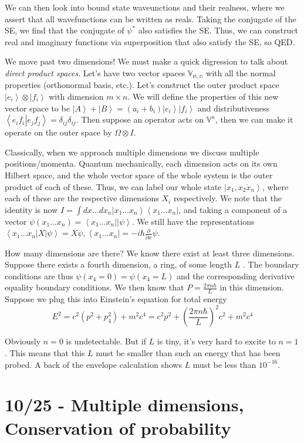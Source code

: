 \documentclass[10pt]{report}
\newcommand{\bra}[1]{\left<#1\right|}
\newcommand{\ket}[1]{\left|#1\right>}
\newcommand{\dotp}[2]{\left<#1\left.\right|#2\right>}
\newcommand{\pd}[2]{\frac{\partial #1}{\partial#2}}
\begin{document}
We can then look into bound state waveunctions and their realness, where we assert that all wavefunctions can be written as reals. Taking the conjugate of the SE, we find that the conjugate of $\psi^*$ also satisfies the SE. Thus, we can construct real and imaginary functions via superposition that also satisfy the SE, so QED.

We move past two dimensions! We must make a quick digression to talk about \emph{direct product spaces}. Let's have two vector spaces $\mathbb{V_{m,n}}$ with all the normal properties (orthonormal basis, etc.). Let's construct the outer product space $\ket{e_i}\otimes \ket{f_i}$ with dimension $m\times n$. We will define the properties of this new vector space to be $\ket{A} + \ket{B} = \left( a_i + b_i \right)\ket{e_i}\ket{f_i}$ and distributiveness $\dotp{e_if_i}{e_jf_j} = \delta_{ij} \delta_{ij}$. Then suppose an operator acts on $\mathbb{V}^n$, then we can make it operate on the outer space by $\Omega \otimes I$. 

Classically, when we approach multiple dimensions we discuss multiple positions/momenta. Quantum mechanically, each dimension acts on its own Hilbert space, and the whole vector space of the whole system is the outer product of each of these. Thus, we can label our whole state $\ket{x_1,x_2\dot x_n}$, where each of these are the respective dimensions $X_i$ respectively. We note that the identity is now $I = \int dx\dots dx_n \ket{x_1\dots x_n} \bra{x_1\dots x_n}$, and taking a component of a vector $\psi(x_1\dots x_n) = \bra{x_1\dots x_n}\ket{\psi}$. We still have the representations $\bra{x_1\dots x_n}X\ket{\psi} = X\psi, \bra{x_1\dots x_n} = -i\hbar \pd{}{x}\psi$. 

How many dimensions are there? We know there exist at least three dimensions. Suppose there exists a fourth dimension, a ring, of some length $L$ . The boundary conditions are thus $\psi(x_4 = 0) = \psi(x_4 = L)$ and the corresponding derivative equality boundary conditions. We then know that $P = \frac{2\pi n\hbar}{L}$ in this dimension. Suppose we plug this into Einstein's equation for total energy
$$E^2 = c^2\left( p^2+p_4^2 \right) + m^2c^4 = c^2p^2 + \left( \frac{2\pi n\hbar}{L} \right)^2c^2 + m^2c^4$$

Obviously $n=0$ is undetectable. But if $L$ is tiny, it's very hard to excite to $n=1$. This means that this $L$ must be smaller than such an energy that has been probed. A back of the envelope calculation shows $L$ must be less than $10^{-16}$. 

\chapter{10/25 - Multiple dimensions, Conservation of probability}
\end{document}
